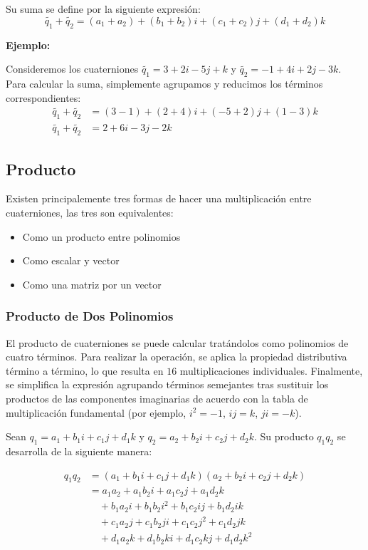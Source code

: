 Su suma se define por la siguiente expresión:
\begin{equation}
    \tilde{q_1} + \tilde{q_2} = (a_1 + a_2) + (b_1 + b_2)i + (c_1 + c_2)j + (d_1 + d_2)k
\end{equation}

\textbf{Ejemplo:}

Consideremos los cuaterniones $\tilde{q_1} = 3 + 2i - 5j + k$ y $\tilde{q_2} = -1 + 4i + 2j - 3k$. Para calcular la suma, simplemente agrupamos y reducimos los términos correspondientes:
\begin{align*}
    \tilde{q_1} + \tilde{q_2} &= (3 - 1) + (2 + 4)i + (-5 + 2)j + (1 - 3)k \\
    \tilde{q_1} + \tilde{q_2} &= 2 + 6i - 3j - 2k
\end{align*}

\subsection{Producto}
Existen principalemente tres formas de hacer una multiplicación entre cuaterniones, las tres son equivalentes:
\begin{itemize}
    \item Como un producto entre polinomios
    \item Como escalar y vector 
    \item Como una matriz por un vector
\end{itemize}

\subsubsection{Producto de Dos Polinomios}
El producto de cuaterniones se puede calcular tratándolos como polinomios de cuatro términos. Para realizar la operación, se aplica la propiedad distributiva término a término, lo que resulta en $16$ multiplicaciones individuales. Finalmente, se simplifica la expresión agrupando términos semejantes tras sustituir los productos de las componentes imaginarias de acuerdo con la tabla de multiplicación fundamental (por ejemplo, $i^2 = -1$, $ij = k$, $ji = -k$).

Sean $q_1 = a_1 + b_1i + c_1j + d_1k$ y $q_2 = a_2 + b_2i + c_2j + d_2k$. Su producto $q_1 q_2$ se desarrolla de la siguiente manera:

\begin{align*}
    q_1 q_2 &= (a_1 + b_1i + c_1j + d_1k)(a_2 + b_2i + c_2j + d_2k) \\
    &= a_1a_2 + a_1b_2i + a_1c_2j + a_1d_2k \\
    &\quad + b_1a_2i + b_1b_2i^2 + b_1c_2ij + b_1d_2ik \\
    &\quad + c_1a_2j + c_1b_2ji + c_1c_2j^2 + c_1d_2jk \\
    &\quad + d_1a_2k + d_1b_2ki + d_1c_2kj + d_1d_2k^2
\end{align*}

